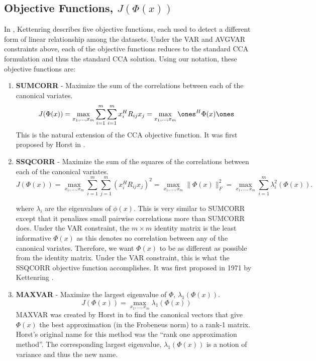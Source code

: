 \subsection{Objective Functions, $J(\Phi(x))$}\label{sec:obj_func}

In \cite{kettenring1971canonical}, Kettenring describes five objective functions, each
used to detect a different form of linear relationship among the datasets. Under the VAR
and AVGVAR constraints above, each of the objective functions reduces to the standard CCA
formulation and thus the standard CCA solution. Using our notation, these objective
functions are:

\begin{enumerate}
\item \textbf{SUMCORR} - Maximize the sum of the correlations between each of the canonical variates.
  \begin{equation*}
    J(\Phi(x)) = \max_{x_1,\dots,x_m} \sum_{i=1}^m\sum_{i=1}^m x_i^HR_{ij}x_j=\max_{x_1,\dots,x_m}\ones^H\Phi(x) \ones 
  \end{equation*}
  This is the natural extension of the CCA objective function. It  was first proposed by
  Horst in \cite{horst1961relations}. 

\item \textbf{SSQCORR} - Maximize the sum of the squares of the correlations between
  each of the canonical variates.
  \begin{equation*}
    J(\Phi(x)) = \max_{x_1,\dots,x_m}\sum_{i=1}^m\sum_{j=1}^m(x_i^HR_{ij}x_j)^2=
    \max_{x_1,\dots,x_m}\|\Phi(x)\|_F^2 =
    \max_{x_1,\dots,x_m}\sum_{i=1}^m\lambda_i^2(\Phi(x)). 
  \end{equation*}

  where $\lambda_i$ are the eigenvalues of $\phi(x)$. This is very similar to SUMCORR
  except that it penalizes small pairwise correlations more than SUMCORR does. Under the
  VAR constraint, the $m\times m$ identity matrix is the least informative $\Phi(x)$ as
  this denotes no correlation between any of the canonical variates. Therefore, we want
  $\Phi(x)$ to be as different as possible from the identity matrix. Under the VAR
  constraint, this is what the SSQCORR objective function accomplishes. It was first
  proposed in 1971 by Kettenring \cite{kettenring1971canonical}.

\item \textbf{MAXVAR} - Maximize the largest eigenvalue of $\Phi$, $\lambda_1(\Phi(x))$.
  \begin{equation*}
    J(\Phi(x)) = \max_{x_1,\dots,x_m}\lambda_1(\Phi(x))
  \end{equation*}
  MAXVAR was created by Horst in \cite{horst1961relations} to find the canonical vectors
  that give $\Phi(x)$ the best approximation (in the Frobeneus norm) to a rank-1
  matrix. Horst's original name for this method was the ``rank one approximation
  method''. The corresponding largest eigenvalue, $\lambda_1(\Phi(x))$ is a notion of
  variance and thus the new name.


\end{enumerate}
